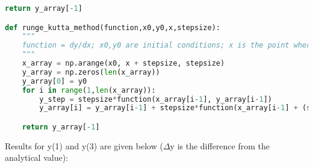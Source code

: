 \documentclass[a4paper,10pt]{article}
\begin{document}
\begin{lstlisting}[language=python]
    return y_array[-1]

def runge_kutta_method(function,x0,y0,x,stepsize):
    """
    function = dy/dx; x0,y0 are initial conditions; x is the point where y needs to be calculated.
    """
    x_array = np.arange(x0, x + stepsize, stepsize)
    y_array = np.zeros(len(x_array))
    y_array[0] = y0
    for i in range(1,len(x_array)):
        y_step = stepsize*function(x_array[i-1], y_array[i-1])
        y_array[i] = y_array[i-1] + stepsize*function(x_array[i-1] + (stepsize/2.0), y_array[i-1] + (y_step/2.0))

    return y_array[-1]
\end{lstlisting}

Results for y(1) and y(3) are given below ($\Delta$y is the difference from the analytical value):




\end{document}
